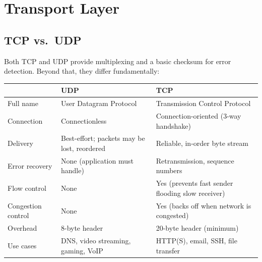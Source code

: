 \documentclass[oneside]{book}
\begin{document}

\chapter{Transport Layer}

\section{TCP vs.\ UDP}


Both TCP and UDP provide multiplexing and a basic checksum for error detection.
Beyond that, they differ fundamentally:

\begin{center}
\begin{tabularx}{\linewidth}{lXX}
\toprule
 & \textbf{UDP} & \textbf{TCP} \\
\midrule
Full name    & User Datagram Protocol & Transmission Control Protocol \\
Connection   & Connectionless & Connection-oriented (3-way handshake) \\
Delivery     & Best-effort; packets may be lost, reordered & Reliable, in-order byte stream \\
Error recovery & None (application must handle) & Retransmission, sequence numbers \\
Flow control & None & Yes (prevents fast sender flooding slow receiver) \\
Congestion control & None & Yes (backs off when network is congested) \\
Overhead     & 8-byte header & 20-byte header (minimum) \\
Use cases    & DNS, video streaming, gaming, VoIP & HTTP(S), email, SSH, file transfer \\
\bottomrule
\end{tabularx}
\end{center}
\end{document}
